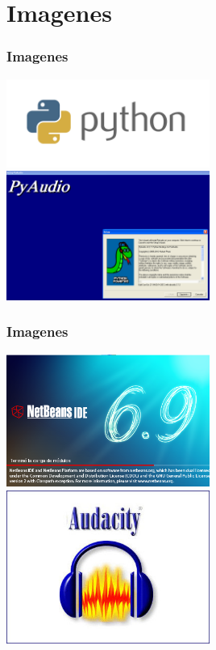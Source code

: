 \documentclass[utf8]{beamer}
\begin{document}
\section{Imagenes}  
\begin{frame}[allowframbreaks]
\frametitle{Imagenes}
\begin{center}
\includegraphics[width=0.5\textwidth]{apli.png}
\includegraphics[width=0.5\textwidth]{dibujo.png}
\end{center}
\end{frame}

\begin{frame}[allowframbreaks]
\frametitle{Imagenes}
\begin{center}
\includegraphics[width=0.5\textwidth]{img1.png}
\includegraphics[width=0.5\textwidth]{img2.jpg}
\end{center}
\end{frame}
\end{document}
